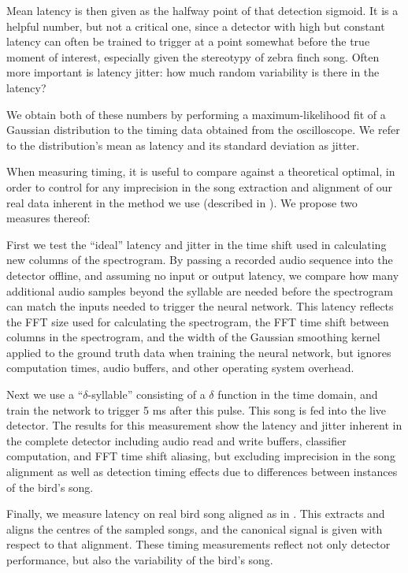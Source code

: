\documentclass[10pt,letterpaper]{article}
\begin{document}
Mean latency is then given as the halfway point of that detection
sigmoid. It is a helpful number, but not a critical one, since a
detector with high but constant latency can often be trained to trigger at a
point somewhat before the true moment of interest, especially given the stereotypy of zebra finch song.  Often more
important is latency jitter: how much random variability is there in
the latency?

We obtain both of these numbers by performing a maximum-likelihood fit of a Gaussian distribution to the timing data obtained from the oscilloscope.  We refer to the distribution's mean as latency and its standard deviation as jitter.

When measuring timing, it is useful to compare against a theoretical optimal, in order to control for any imprecision in the song extraction
and alignment of our real data inherent in the method we use (described in
\cite{Poole2012}).  We propose two measures thereof:

First we test the ``ideal'' latency and jitter in the time shift used in 
calculating new columns of the spectrogram. By passing a recorded 
audio sequence into the detector offline, and assuming no input or output 
latency, we compare how many additional audio 
samples beyond the syllable are needed before the spectrogram 
can match the inputs needed to trigger the neural network.  This latency reflects the 
FFT size used for calculating the spectrogram, the FFT time shift 
between columns in the spectrogram, and the width of the Gaussian 
smoothing kernel applied to the ground truth data when training 
the neural network, but ignores computation times, audio buffers, and other operating system overhead.

Next we use a ``$\delta$-syllable'' consisting
of a $\delta$ function in the time domain, and train the network to
trigger 5 ms after this pulse.  This song is fed into the live detector.  The results for this measurement show
the latency and jitter inherent in the complete detector
including audio read and write buffers, classifier
computation, and FFT time shift aliasing, but excluding imprecision in the song alignment as well as detection timing effects due to differences between instances of the bird's song.

Finally, we measure latency on real bird song aligned as in \cite{Poole2012}.  This extracts and aligns the centres of the sampled songs, and the canonical signal is given with respect to that alignment.  These timing measurements reflect not only detector performance, but also the variability of the bird's song.
\end{document}
